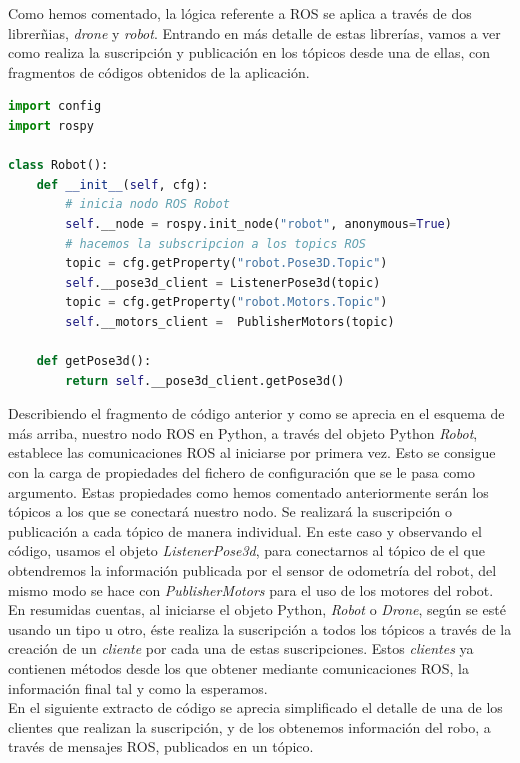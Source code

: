 Como hemos comentado, la lógica referente a ROS se aplica a través de dos librerñias, \textit{drone} y \textit{robot}. Entrando en más detalle de estas librerías, vamos a ver como realiza la suscripción y publicación en los tópicos desde una de ellas, con fragmentos de códigos obtenidos de la aplicación.\\

\begin{lstlisting}[language=python,firstnumber=1]
import config
import rospy

class Robot():
    def __init__(self, cfg):
        # inicia nodo ROS Robot
        self.__node = rospy.init_node("robot", anonymous=True)
        # hacemos la subscripcion a los topics ROS
        topic = cfg.getProperty("robot.Pose3D.Topic")
        self.__pose3d_client = ListenerPose3d(topic)
        topic = cfg.getProperty("robot.Motors.Topic")
        self.__motors_client =  PublisherMotors(topic)
        
	def getPose3d():
		return self.__pose3d_client.getPose3d()
\end{lstlisting}

Describiendo el fragmento de código anterior y como se aprecia en el esquema de más arriba, nuestro nodo ROS en Python, a través del objeto Python \textit{Robot}, establece las comunicaciones ROS al iniciarse por primera vez. Esto se consigue con la carga de propiedades del fichero de configuración que se le pasa como argumento. Estas propiedades como hemos comentado anteriormente serán los tópicos a los que se conectará nuestro nodo. Se realizará la suscripción o publicación a cada tópico de manera individual. En este caso y observando el código,  usamos el objeto \textit{ListenerPose3d}, para conectarnos al tópico de el que obtendremos la información publicada por el sensor de odometría del robot, del mismo modo se hace con \textit{PublisherMotors} para el uso de los motores del robot.\\

En resumidas cuentas, al iniciarse el objeto Python, \textit{Robot} o \textit{Drone}, según se esté usando un tipo u otro, éste realiza la suscripción a todos los tópicos a través de la creación de un \textit{cliente} por cada una de estas suscripciones. Estos \textit{clientes} ya contienen métodos desde los que obtener mediante comunicaciones ROS, la información final tal y como la esperamos.\\

En el siguiente extracto de código se aprecia simplificado el detalle de una de los clientes que realizan la suscripción, y de los obtenemos información del robo, a través de mensajes ROS, publicados en un tópico.

